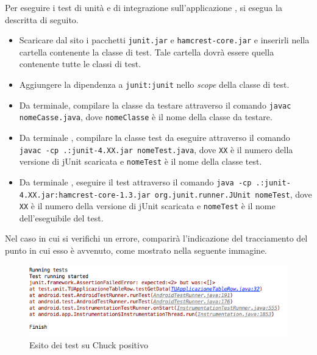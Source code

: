 				Per eseguire i test di unità e di integrazione sull'applicazione , si esegua la  descritta di seguito.
				\begin{itemize}
					\item Scaricare dal sito  i pacchetti \texttt{junit.jar} e \texttt{hamcrest-core.jar} e inserirli nella cartella contenente la classe di test. Tale cartella dovrà essere quella contenente tutte le classi di test.
					\item Aggiungere la dipendenza a \texttt{junit:junit} nello \textit{scope} della classe di test.
					\item Da terminale, compilare la classe da testare attraverso il comando \texttt{javac nomeCasse.java}, dove \texttt{nomeClasse} è il nome della classe da testare.
					\item Da terminale , compilare la classe test da eseguire attraverso il comando \texttt{javac -cp .:junit-4.XX.jar nomeTest.java}, dove \texttt{XX} è il numero della versione di jUnit scaricata e \texttt{nomeTest} è il nome della classe test.
					\item Da terminale , eseguire il test attraverso il comando \texttt{java -cp .:junit-4.XX.jar:hamcrest-core-1.3.jar org.junit.runner.JUnit nomeTest}, dove \texttt{XX} è il numero della versione di jUnit scaricata e \texttt{nomeTest} è il nome dell'eseguibile del test.
				\end{itemize}
				Nel caso in cui si verifichi un errore, comparirà l'indicazione del tracciamento del punto in cui esso è avvenuto, come mostrato nella seguente immagine.
					\begin{figure}[H]
						\centering
							\includegraphics[scale=0.5]{Pics/JUnitTestFail.png}
						\caption{Esito dei test su Chuck positivo}
					\end{figure}
				
